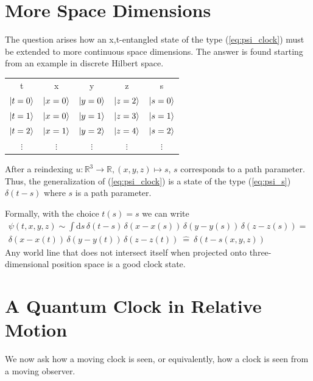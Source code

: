 \documentclass[12pt]{article}
\begin{document}
\section{More Space Dimensions}

The question arises how an x,t-entangled state of the type (\ref{eq:psi_clock}) must be extended to more continuous space dimensions. The answer is found starting from an example in discrete Hilbert space.
\begin{center}
\begin{tabular}{ |c|c|c|c|c| } 
 \hline
 t & x & y & z & s \\ 
 $\ket{t=0}$ & $\ket{x=0}$ & $\ket{y=0}$ & $\ket{z=2}$ & $\ket{s=0}$  \\
 $\ket{t=1}$ & $\ket{x=0}$ & $\ket{y=1}$ & $\ket{z=3}$ & $\ket{s=1}$  \\
 $\ket{t=2}$ & $\ket{x=1}$ & $\ket{y=2}$ & $\ket{z=4}$ & $\ket{s=2}$  \\
 $\vdots$ & $\vdots$ & $\vdots$ & $\vdots$ & $\vdots$ \\
 \hline
\end{tabular}
\end{center}
After a reindexing $u: \mathbb{R}^3 \rightarrow \mathbb{R}, (x,y,z) \mapsto s$, $s$ corresponds to a path parameter. Thus, the generalization of (\ref{eq:psi_clock}) is a state of the type (\ref{eq:psi_s}) $\delta(t-s)$ where $s$ is a path parameter.

Formally, with the choice $t(s) = s$ we can write
\begin{equation} 
\begin{split}
\label{eq:psi_clock_3d_space}
\psi(t,x,y,z) \sim \int \mathrm ds \, \delta(t-s) \, \delta(x-x(s)) \, \delta(y-y(s)) \, \delta(z-z(s)) = 
\\
\delta(x-x(t)) \, \delta(y-y(t)) \, \delta(z-z(t)) \ \hat{=}\ \delta(t-s(x,y,z))
\end{split}
\end{equation}
Any world line that does not intersect itself when projected onto three-dimensional position space is a good clock state. 

\section{A Quantum Clock in Relative Motion}

We now ask how a moving clock is seen, or equivalently, how a clock is seen from a moving observer. 
\end{document}
